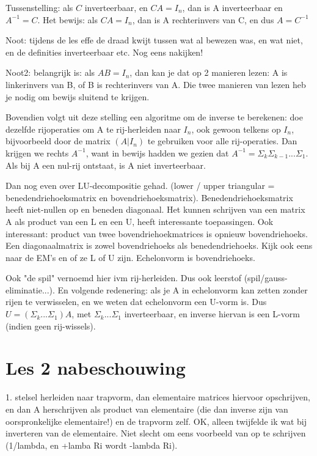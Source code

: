 \documentclass{article}
\begin{document}
Tussenstelling: als $C$ inverteerbaar, en $CA=I_n$, dan is A inverteerbaar en $A^{-1}=C$. Het bewijs: als $CA=I_n$, dan is A rechterinvers van C, en dus $A=C^{-1}$

Noot: tijdens de les effe de draad kwijt tussen wat al bewezen was, en wat niet, en de definities inverteerbaar etc. Nog eens nakijken! 

Noot2: belangrijk is: als $AB=I_n$, dan kan je dat op 2 manieren lezen: A is linkerinvers van B, of B is rechterinvers van A. Die twee manieren van lezen heb je nodig om bewijs sluitend te krijgen. 

Bovendien volgt uit deze stelling een algoritme om de inverse te berekenen: doe dezelfde rijoperaties om A te rij-herleiden naar $I_n$, ook gewoon telkens op $I_n$, bijvoorbeeld door de matrix $(A|I_n)$ te gebruiken voor alle rij-operaties. Dan krijgen we rechts $A^{-1}$, want in bewijs hadden we gezien dat $A^{-1} = \Sigma_k \Sigma_{k-1} ... \Sigma_1$. Als bij A een nul-rij ontstaat, is A niet inverteerbaar. 

Dan nog even over LU-decompositie gehad. (lower / upper triangular = benedendriehoeksmatrix en bovendriehoeksmatrix). Benedendriehoeksmatrix heeft niet-nullen op en beneden diagonaal. Het kunnen schrijven van een matrix A als product van een L en een U, heeft interessante toepassingen. Ook interessant: product van twee bovendriehoekmatrices is opnieuw bovendriehoeks. Een diagonaalmatrix is zowel bovendriehoeks als benedendriehoeks. Kijk ook eens naar de EM's en of ze L of U zijn. Echelonvorm is bovendriehoeks. 

Ook "de spil" vernoemd hier ivm rij-herleiden. Dus ook leerstof (spil/gauss-eliminatie...). En volgende redenering: als je A in echelonvorm kan zetten zonder rijen te verwisselen, en we weten dat echelonvorm een U-vorm is. Dus $U= (\Sigma_k ... \Sigma_1) A$, met $\Sigma_k ... \Sigma_1$ inverteerbaar, en inverse hiervan is een L-vorm (indien geen rij-wissels). 

\section{Les 2 nabeschouwing}

1. stelsel herleiden naar trapvorm, dan elementaire matrices hiervoor opschrijven, en dan A herschrijven als product van elementaire (die dan inverse zijn van oorspronkelijke elementaire!) en de trapvorm zelf. 
OK, alleen twijfelde ik wat bij inverteren van de elementaire. Niet slecht om eens voorbeeld van op te schrijven (1/lambda, en +lamba Ri wordt -lambda Ri). 
\end{document}
